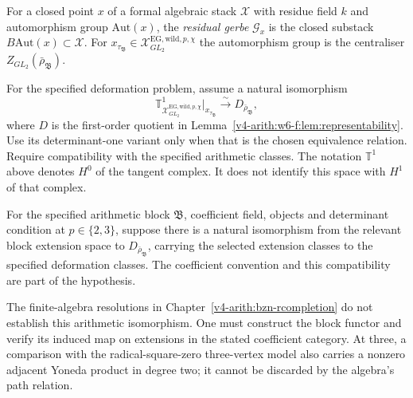 \begin{definition}
\label{v4-arith:w6-f:def:residual-gerbe}
For a closed point \(x\) of a formal
algebraic stack \(\mathcal{X}\) with residue field \(k\) and
automorphism group \(\mathrm{Aut}(x)\), the \emph{residual gerbe}
\(\mathcal{G}_{x}\) is the closed substack \(B\mathrm{Aut}(x)\subset\mathcal{X}\).
For \(x_{\tau_{\mathfrak{B}}}\in\mathcal{X}^{\mathrm{EG,wild},p,\chi}_{GL_{2}}\)
the automorphism group is the centraliser
\(Z_{GL_{2}}(\bar\rho_{\mathfrak{B}})\).
\end{definition}

\begin{hypothesis}
\label{v4-arith:w6-f:prop:gerbe-cotangent-match}
For the specified deformation problem, assume a natural isomorphism
\begin{equation}
\label{v4-arith:w6-f:eq:gerbe-cotangent}
 \mathbb T^1_{\mathcal X^{\mathrm{EG,wild},p,\chi}_{GL_2}}
 \big|_{x_{\tau_{\mathfrak B}}}
 \xrightarrow{\sim} D_{\bar\rho_{\mathfrak B}},
\end{equation}
where \(D\) is the first-order quotient in
Lemma~\ref{v4-arith:w6-f:lem:representability}. Use its determinant-one
variant only when that is the chosen equivalence relation.
Require compatibility with the specified arithmetic classes.
The notation \(\mathbb T^1\) above denotes \(H^0\) of the tangent
complex. It does not identify this space with \(H^1\) of that complex.
\end{hypothesis}

\begin{hypothesis}
\label{v4-arith:w6-f:prop:Paskunas-equals-Galois}
For the specified arithmetic block \(\mathfrak B\), coefficient
field, objects and determinant condition at \(p\in\{2,3\}\),
suppose there is a natural isomorphism from the relevant block
extension space to
\(D_{\bar\rho_{\mathfrak B}}\), carrying the selected extension classes
to the specified deformation classes. The coefficient convention
and this compatibility are part of the hypothesis.
\end{hypothesis}

The finite-algebra resolutions in
Chapter~\ref{v4-arith:bzn-rcompletion} do not establish this
arithmetic isomorphism. One must construct the block functor and
verify its induced map on extensions in the stated coefficient
category. At three, a comparison with the radical-square-zero
three-vertex model also carries a nonzero adjacent Yoneda product
in degree two; it cannot be discarded by the algebra's path relation.

